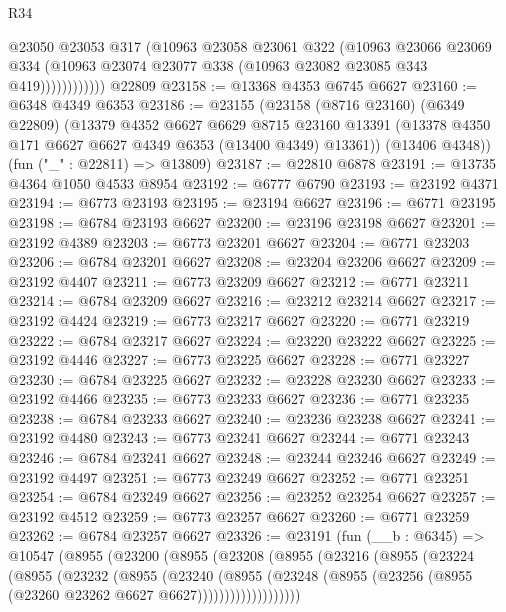 \begin{lexlean}{R34}
\begin{coremodule}
                    @23050
                    @23053
                    @317
                    (@10963
                      @23058
                      @23061
                      @322
                      (@10963
                        @23066
                        @23069
                        @334
                        (@10963 @23074 @23077 @338 (@10963 @23082 @23085 @343 @419))))))))))))
    @22809
@23158 := @13368 @4353 @6745 @6627
@23160 := @6348 @4349 @6353
@23186 := @23155
    (@23158
      (@8716 @23160)
      (@6349 @22809)
      (@13379
        @4352
        @6627
        @6629
        @8715
        @23160
        @13391
        (@13378 @4350 @171 @6627 @6627 @4349 @6353 (@13400 @4349) @13361))
      (@13406 @4348))
    (fun ("_" : @22811) => @13809)
@23187 := @22810 @6878
@23191 := @13735 @4364 @1050 @4533 @8954
@23192 := @6777 @6790
@23193 := @23192 @4371
@23194 := @6773 @23193
@23195 := @23194 @6627
@23196 := @6771 @23195
@23198 := @6784 @23193 @6627
@23200 := @23196 @23198 @6627
@23201 := @23192 @4389
@23203 := @6773 @23201 @6627
@23204 := @6771 @23203
@23206 := @6784 @23201 @6627
@23208 := @23204 @23206 @6627
@23209 := @23192 @4407
@23211 := @6773 @23209 @6627
@23212 := @6771 @23211
@23214 := @6784 @23209 @6627
@23216 := @23212 @23214 @6627
@23217 := @23192 @4424
@23219 := @6773 @23217 @6627
@23220 := @6771 @23219
@23222 := @6784 @23217 @6627
@23224 := @23220 @23222 @6627
@23225 := @23192 @4446
@23227 := @6773 @23225 @6627
@23228 := @6771 @23227
@23230 := @6784 @23225 @6627
@23232 := @23228 @23230 @6627
@23233 := @23192 @4466
@23235 := @6773 @23233 @6627
@23236 := @6771 @23235
@23238 := @6784 @23233 @6627
@23240 := @23236 @23238 @6627
@23241 := @23192 @4480
@23243 := @6773 @23241 @6627
@23244 := @6771 @23243
@23246 := @6784 @23241 @6627
@23248 := @23244 @23246 @6627
@23249 := @23192 @4497
@23251 := @6773 @23249 @6627
@23252 := @6771 @23251
@23254 := @6784 @23249 @6627
@23256 := @23252 @23254 @6627
@23257 := @23192 @4512
@23259 := @6773 @23257 @6627
@23260 := @6771 @23259
@23262 := @6784 @23257 @6627
@23326 := @23191
    (fun (__b : @6345) =>
    @10547
      (@8955
        (@23200
          (@8955
            (@23208
              (@8955
                (@23216
                  (@8955
                    (@23224
                      (@8955
                        (@23232
                          (@8955
                            (@23240
                              (@8955
                                (@23248
                                  (@8955
                                    (@23256 (@8955 (@23260 @23262 @6627 @6627)))))))))))))))))))

\end{coremodule}
\end{lexlean}
